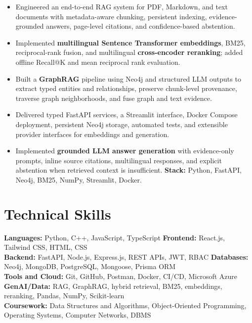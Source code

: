 \documentclass[a4paper,10pt]{article}
\begin{document}
\begin{itemize}
  \item Engineered an end-to-end RAG system for PDF, Markdown, and text
  documents with metadata-aware chunking, persistent indexing,
  evidence-grounded answers, page-level citations, and confidence-based
  abstention.

  \item Implemented \textbf{multilingual Sentence Transformer embeddings},
  BM25, reciprocal-rank fusion, and multilingual \textbf{cross-encoder
  reranking}; added offline Recall@K and mean reciprocal rank evaluation.

  \item Built a \textbf{GraphRAG} pipeline using Neo4j and structured LLM
  outputs to extract typed entities and relationships, preserve chunk-level
  provenance, traverse graph neighborhoods, and fuse graph and text evidence.

  \item Delivered typed FastAPI services, a Streamlit interface, Docker
  Compose deployment, persistent Neo4j storage, automated tests, and
  extensible provider interfaces for embeddings and generation.

  \item Implemented \textbf{grounded LLM answer generation} with evidence-only
  prompts, inline source citations, multilingual responses, and explicit
  abstention when retrieved context is insufficient.
  \textbf{Stack:} Python, FastAPI, Neo4j, BM25, NumPy, Streamlit, Docker.
\end{itemize}


\section{Technical Skills}

\textbf{Languages:} Python, C++, JavaScript, TypeScript
\quad
\textbf{Frontend:} React.js, Tailwind CSS, HTML, CSS\\
\textbf{Backend:} FastAPI, Node.js, Express.js, REST APIs, JWT, RBAC
\quad
\textbf{Databases:} Neo4j, MongoDB, PostgreSQL, Mongoose, Prisma ORM\\
\textbf{Tools and Cloud:} Git, GitHub, Postman, Docker, CI/CD, Microsoft Azure
\quad
\textbf{GenAI/Data:} RAG, GraphRAG, hybrid retrieval, BM25, embeddings,
reranking, Pandas, NumPy, Scikit-learn\\
\textbf{Coursework:} Data Structures and Algorithms, Object-Oriented
Programming, Operating Systems, Computer Networks, DBMS
\end{document}
